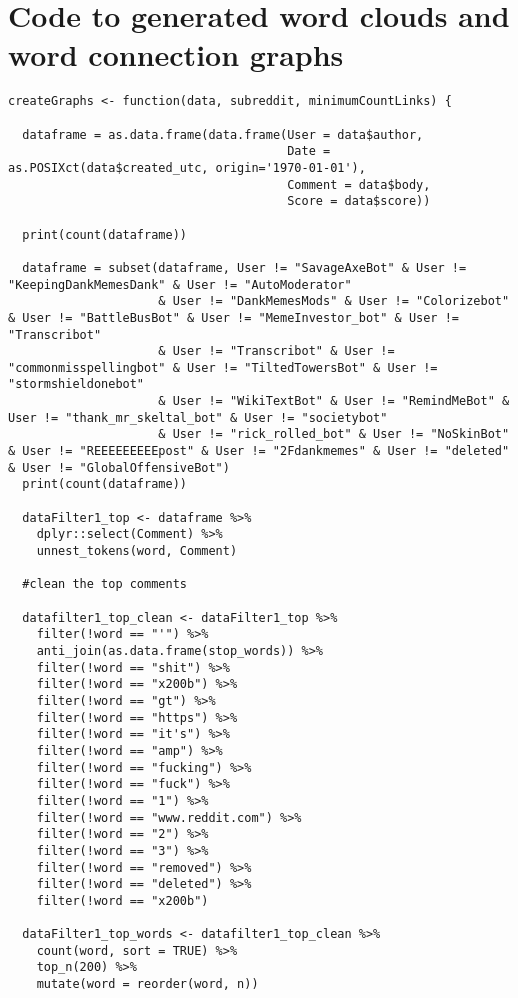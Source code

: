 \section{Code to generated word clouds and word connection graphs}
\label{sec:AppedexFUNC}
\begin{lstlisting}
createGraphs <- function(data, subreddit, minimumCountLinks) {
  
  dataframe = as.data.frame(data.frame(User = data$author, 
                                       Date = as.POSIXct(data$created_utc, origin='1970-01-01'), 
                                       Comment = data$body,
                                       Score = data$score))
  
  print(count(dataframe))
  
  dataframe = subset(dataframe, User != "SavageAxeBot" & User != "KeepingDankMemesDank" & User != "AutoModerator" 
                     & User != "DankMemesMods" & User != "Colorizebot" & User != "BattleBusBot" & User != "MemeInvestor_bot" & User != "Transcribot"
                     & User != "Transcribot" & User != "commonmisspellingbot" & User != "TiltedTowersBot" & User != "stormshieldonebot"
                     & User != "WikiTextBot" & User != "RemindMeBot" & User != "thank_mr_skeltal_bot" & User != "societybot"
                     & User != "rick_rolled_bot" & User != "NoSkinBot" & User != "REEEEEEEEEpost" & User != "2Fdankmemes" & User != "deleted" & User != "GlobalOffensiveBot")
  print(count(dataframe))
  
  dataFilter1_top <- dataframe %>%
    dplyr::select(Comment) %>%
    unnest_tokens(word, Comment)
  
  #clean the top comments
  
  datafilter1_top_clean <- dataFilter1_top %>%
    filter(!word == "'") %>%
    anti_join(as.data.frame(stop_words)) %>%
    filter(!word == "shit") %>%
    filter(!word == "x200b") %>%
    filter(!word == "gt") %>%
    filter(!word == "https") %>%
    filter(!word == "it's") %>%
    filter(!word == "amp") %>%
    filter(!word == "fucking") %>%
    filter(!word == "fuck") %>%
    filter(!word == "1") %>%
    filter(!word == "www.reddit.com") %>%
    filter(!word == "2") %>%
    filter(!word == "3") %>%
    filter(!word == "removed") %>%
    filter(!word == "deleted") %>%
    filter(!word == "x200b")
  
  dataFilter1_top_words <- datafilter1_top_clean %>% 
    count(word, sort = TRUE) %>%
    top_n(200) %>%
    mutate(word = reorder(word, n))
  

\end{lstlisting}
